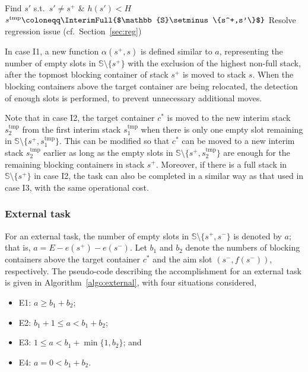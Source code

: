 \documentclass[review,3p,times,12pt,number]{elsarticle}\usepackage{amsmath}\usepackage{amssymb}
\renewcommand{\gets}{\coloneqq}
\newcommand{\mts}{s^\mathrm{tmp}}
\begin{document}
\begin{algorithm*}[htbp]
\begin{multicols}{2}
  {
    Find $s'$ s.t.\ $s'\neq s^+$ \& $h(s')<H$\;
    $\mts\gets \InterimFull{$\mathbb{S}\setminus\{s^+,s'\}$}$\;\label{line:wholly}
    \BiSender{$\mts, 1, s^+, b_1, \{s'\}$}\;\label{line:dualsender}
    \Move{$s^+, 1, \mts$}\;
    \;
    \Move{$\mts, 1, s^+$}\;
    Resolve regression issue (cf.\ Section~\ref{sec:reg})\;
  }

\end{multicols}
\BlankLine
\BlankLine
\end{algorithm*}

In case I1, a new function $\alpha(s^+,s)$ is defined similar to $a$, representing the number of empty slots in $\mathbb{S}\setminus\{s^+\}$ with the exclusion of the highest non-full stack, after the topmost blocking container of stack $s^+$ is moved to stack $s$. When the blocking containers above the target container are being relocated, the detection of enough slots is performed,  to prevent unnecessary additional moves.

Note that in case I2, the target container $c^*$ is moved to the new interim stack $\mts_2$ from the first interim stack $\mts_1$ when there is only one empty slot remaining in $\mathbb{S}\setminus\{s^+,\mts_1\}$. This can be modified so that $c^*$ can be moved to a new interim stack $\mts_2$ earlier as long as the empty slots in $\mathbb{S}\setminus\{s^+,\mts_2\}$ are enough for the remaining blocking containers in stack $s^+$. Moreover, if there is a full stack in $\mathbb{S}\setminus\{s^+\}$ in case I2, the task can also be completed in a similar way as that used in case I3, with the same operational cost.

\subsubsection{External task}

For an external task, the number of empty slots in $\mathbb{S}\setminus\{s^+,s^-\}$ is denoted by $a$; that is, $a=E-e(s^+)-e(s^-)$. Let $b_1$ and $b_2$ denote the numbers of blocking containers above the target container $c^*$ and the aim slot $(s^-,f(s^-))$, respectively. The pseudo-code describing the accomplishment for an external task is given in Algorithm~\ref{algo:external}, with four situations considered,\begin{itemize}
\item E1: $a\ge b_1+b_2$;
\item E2: $b_1+1\le a<b_1+b_2$;
\item E3: $1\le a<b_1+\min\{1,b_2\}$; and
\item E4: $a=0<b_1+b_2$.
\end{itemize}
\end{document}
